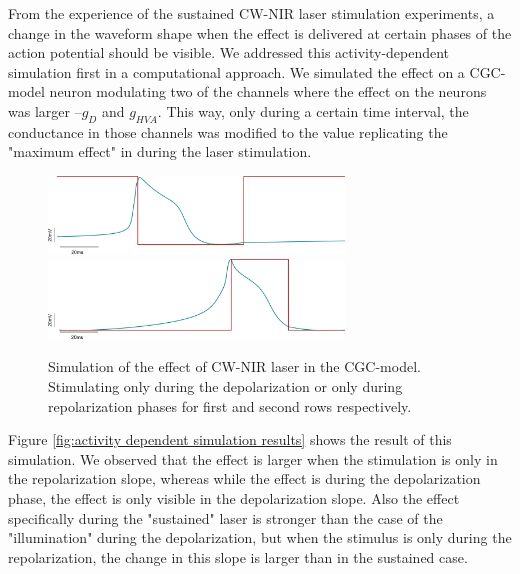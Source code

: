 From the experience of the sustained CW-NIR laser stimulation experiments, a change in the waveform shape when the effect is delivered at certain phases of the action potential should be visible. We addressed this activity-dependent simulation first in a computational approach. We simulated the effect on a CGC-model neuron modulating two of the channels where the effect on the neurons was larger --$g_D$ and $g_{HVA}$. This way, only during a certain time interval, the conductance in those channels was modified to the value replicating the "maximum effect" in during the laser stimulation. 

\begin{figure}[htb!]
	\centering
	\includegraphics[width=0.7\textwidth]{img/laser/activity-dependent-model/depol_model.png}
	\includegraphics[width=0.7\textwidth]{img/laser/activity-dependent-model/repol_model.png}
	\caption{Simulation of the effect of CW-NIR laser in the CGC-model. Stimulating only during the depolarization or only during repolarization phases for first and second rows respectively.}
	\label{fig:activity dependent model stimulation}
\end{figure}

Figure \ref{fig:activity dependent simulation results} shows the result of this simulation. We observed that the effect is larger when the stimulation is only in the repolarization slope, whereas while the effect is during the depolarization phase, the effect is only visible in the depolarization slope. Also the effect specifically during the "sustained" laser is stronger than the case of the "illumination" during the depolarization, but when the stimulus is only during the repolarization, the change in this slope is larger than in the sustained case.

